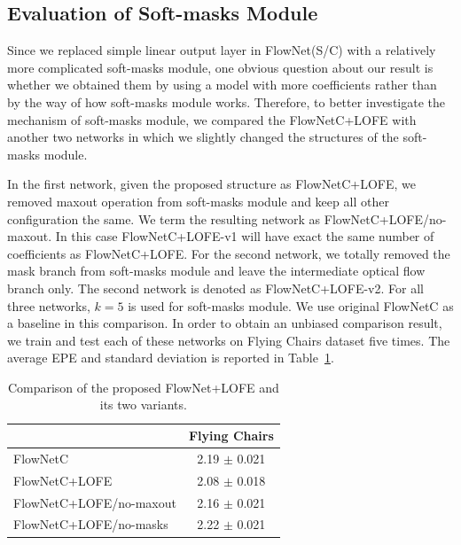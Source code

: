 \documentclass[10pt,twocolumn,letterpaper]{article}
\begin{document}
\subsection{Evaluation of Soft-masks Module}
Since we replaced simple linear output layer in FlowNet(S/C) with a relatively more complicated soft-masks module, one obvious question about our result is whether we obtained them by using a model with more coefficients rather than by the way of how soft-masks module works. Therefore, to better investigate the mechanism of soft-masks module, we compared the FlowNetC+LOFE with another two networks in which we slightly changed the structures of the soft-masks module.

In the first network, given the proposed structure as FlowNetC+LOFE, we removed maxout operation from soft-masks module and keep all other configuration the same. We term the resulting network as FlowNetC+LOFE/no-maxout. In this case FlowNetC+LOFE-v1 will have exact the same number of coefficients as FlowNetC+LOFE. For the second network, we totally removed the mask branch from soft-masks module and leave the intermediate optical flow branch only. The second network is denoted as FlowNetC+LOFE-v2. For all three networks, $k=5$ is used for soft-masks module. We use original FlowNetC as a baseline in this comparison. In order to obtain an unbiased comparison result, we train and test each of these networks on Flying Chairs dataset five times. The average EPE and standard deviation is reported in Table~\ref{tab: flownet variants}.

\begin{table}[]
\centering
\caption{Comparison of the proposed FlowNet+LOFE and its two variants.}
\label{tab: flownet variants}
\begin{tabular}{lc}
\hline
\hline
                         & Flying Chairs \\ \hline
FlowNetC                 & 2.19 $\pm$ 0.021            \\
FlowNetC+LOFE            & 2.08 $\pm$ 0.018            \\
FlowNetC+LOFE/no-maxout  & 2.16 $\pm$ 0.021            \\
FlowNetC+LOFE/no-masks   & 2.22 $\pm$ 0.021            \\
\hline
\end{tabular}
\end{table}
\end{document}
